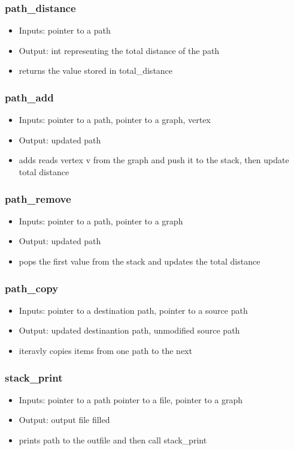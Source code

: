 \documentclass{article}
\begin{document}
\subsubsection{path\_distance}
\begin{itemize}
    \item Inputs: pointer to a path 
    \item Output: int representing the total distance of the path
    \item returns the value stored in total\_distance 
\end{itemize}
\subsubsection{path\_add}
\begin{itemize}
    \item Inputs: pointer to a path, pointer to a graph, vertex 
    \item Output: updated path 
    \item adds reads vertex v from the graph and push it to the stack, then update total distance 
\end{itemize}
\subsubsection{path\_remove}
\begin{itemize}
    \item Inputs: pointer to a path, pointer to a graph 
    \item Output: updated path
    \item pops the first value from the stack and updates the total distance 
\end{itemize}
\subsubsection{path\_copy}
\begin{itemize}
    \item Inputs: pointer to a destination path, pointer to a source path
    \item Output: updated destinantion path, unmodified source path
    \item iteravly copies items from one path to the next 
\end{itemize}
\subsubsection{stack\_print}
\begin{itemize}
    \item Inputs: pointer to a path pointer to a file, pointer to a graph
    \item Output: output file filled 
    \item prints path to the outfile and then call stack\_print
\end{itemize}
\end{document}
